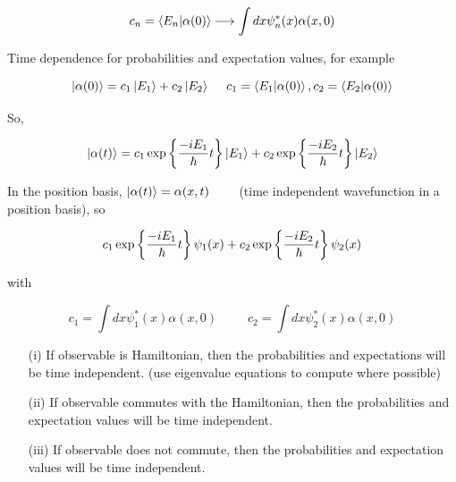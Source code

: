 \documentclass[english, 11pt]{article}
\begin{document}
      \[ c_n = \braket{E_n}{\alpha(0)} \longrightarrow \int dx \psi_n^*(x) \alpha(x,0) \]

      Time dependence for probabilities and expectation values, for example

      \[ \ket{\alpha(0)} = c_1\ket{E_1} + c_2\ket{E_2} \ \ \ \ c_1 = \braket{E_1}{\alpha(0)}, c_2 = \braket{E_2}{\alpha(0)} \]

      So,

      \[ \left|\alpha(t)\right\rangle = c_1\exp \left\{ \frac{-iE_1}{\hbar}t \right\}\left|E_1\right\rangle + c_2\exp \left\{ \frac{-iE_2}{\hbar}t \right\}\left|E_2\right\rangle \]

      In the position basis, $\left|\alpha(t)\right\rangle = \alpha(x,t)$  \ \ \ \ (time independent wavefunction in a position basis), so

      \[ c_1 \exp \left\{ \frac{-iE_1}{\hbar}t \right\} \psi_1(x) + c_2\exp \left\{ \frac{-iE_2}{\hbar}t \right\}\psi_2(x)\]

      with

      \[ c_1 = \int dx \psi_1^*(x)\alpha(x,0) \ \ \ \ \ \  \ \ \ \ \ c_2 = \int dx \psi_2^*(x)\alpha(x,0) \]

      \begin{itemize}
        \item[(i)] If observable is Hamiltonian, then the probabilities and expectations will be time independent. (use eigenvalue equations to compute where possible)
        \item[(ii)] If observable commutes with the Hamiltonian, then the probabilities and expectation values will be time independent.
        \item[(iii)] If observable does not commute, then the probabilities and expectation values will be time independent.
      \end{itemize}
\end{document}
